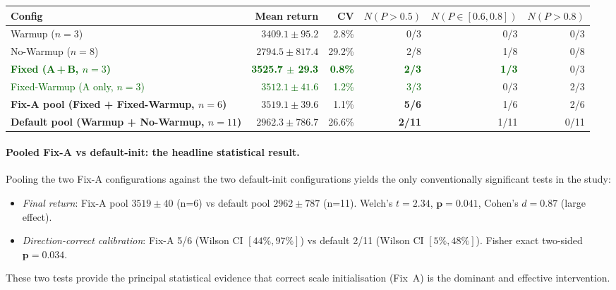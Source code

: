 \documentclass[10pt,a4paper]{article}
\begin{document}
\begin{center}
\setlength{\tabcolsep}{5pt}
\begin{tabular}{lrrrrr}
\toprule
\textbf{Config} & \textbf{Mean return} & \textbf{CV}
  & $N(P{>}0.5)$ & $N(P{\in}[0.6,0.8])$ & $N(P{>}0.8)$ \\
\midrule
Warmup ($n=3$)              & $3409.1 \pm  95.2$ &  2.8\% & 0/3 & 0/3 & 0/3 \\
No-Warmup ($n=8$)           & $2794.5 \pm 817.4$ & 29.2\% & 2/8 & 1/8 & 0/8 \\
\textcolor{darkgreen}{\textbf{Fixed (A\,+\,B, $n=3$)}}
  & \textcolor{darkgreen}{\textbf{3525.7 $\pm$ 29.3}}
  & \textcolor{darkgreen}{\textbf{0.8\%}}
  & \textcolor{darkgreen}{\textbf{2/3}}
  & \textcolor{darkgreen}{\textbf{1/3}} & 0/3 \\
\textcolor{darkgreen}{Fixed-Warmup (A only, $n=3$)}
  & \textcolor{darkgreen}{$3512.1 \pm 41.6$}
  & \textcolor{darkgreen}{1.2\%}
  & \textcolor{darkgreen}{3/3} & 0/3 & 2/3 \\
\midrule
\textbf{Fix-A pool (Fixed + Fixed-Warmup, $n=6$)}
  & $\mathbf{3519.1 \pm 39.6}$ & 1.1\% & \textbf{5/6} & 1/6 & 2/6 \\
\textbf{Default pool (Warmup + No-Warmup, $n=11$)}
  & $\mathbf{2962.3 \pm 786.7}$ & 26.6\% & \textbf{2/11} & 1/11 & 0/11 \\
\bottomrule
\end{tabular}
\end{center}

\paragraph{Pooled Fix-A vs default-init: the headline statistical result.}
Pooling the two Fix-A configurations against the two default-init
configurations yields the only conventionally significant tests in the study:

\begin{itemize}
  \item \emph{Final return}: Fix-A pool $3519\pm40$ (n=6) vs default pool
        $2962\pm787$ (n=11). Welch's $t=2.34$, $\mathbf{p=0.041}$, Cohen's
        $d=0.87$ (large effect).
  \item \emph{Direction-correct calibration}: Fix-A 5/6 (Wilson CI
        $[44\%,97\%]$) vs default 2/11 (Wilson CI $[5\%,48\%]$). Fisher
        exact two-sided $\mathbf{p=0.034}$.
\end{itemize}

These two tests provide the principal statistical evidence that correct
scale initialisation (Fix~A) is the dominant and effective intervention.
\end{document}
